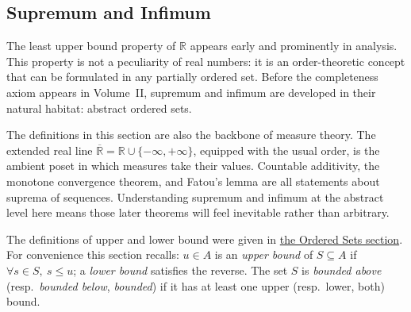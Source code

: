 
\subsection{Supremum and Infimum}\label{sec:sup-inf}



\begin{exposition}
The least upper bound property of $\mathbb{R}$ appears early and prominently
in analysis.  This property is not a peculiarity
of real numbers: it is an order-theoretic concept that can be formulated in
any partially ordered set.  Before the completeness axiom appears in Volume~II,
supremum and infimum are developed in their natural habitat: abstract ordered
sets.
\end{exposition}

\begin{exposition}
The definitions in this section are also the backbone of measure theory.
The extended real line $\overline{\mathbb{R}} = \mathbb{R} \cup \{-\infty,
+\infty\}$, equipped with the usual order, is the ambient poset in which
measures take their values.  Countable additivity, the monotone convergence
theorem, and Fatou's lemma are all statements about suprema of sequences.
Understanding supremum and infimum at the abstract level here means those
later theorems will feel inevitable rather than arbitrary.
\end{exposition}


\begin{exposition}
The definitions of upper and lower bound were given in
\hyperref[def:upper-bound]{the Ordered Sets section}.  For convenience
this section recalls: $u \in A$ is an \emph{upper bound} of $S \subseteq A$ if
$\forall s \in S,\ s \leq u$; a \emph{lower bound} satisfies the
reverse.  The set $S$ is \emph{bounded above} (resp.\ \emph{bounded below},
\emph{bounded}) if it has at least one upper (resp.\ lower, both) bound.
\end{exposition}

